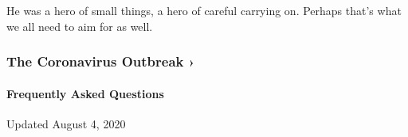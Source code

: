 He was a hero of small things, a hero of careful carrying on. Perhaps
that's what we all need to aim for as well.

\href{https://www.nytimes3xbfgragh.onion/news-event/coronavirus?action=click\&pgtype=Article\&state=default\&region=MAIN_CONTENT_3\&context=storylines_faq}{}

\hypertarget{the-coronavirus-outbreak-}{%
\subsubsection{The Coronavirus Outbreak
›}\label{the-coronavirus-outbreak-}}

\hypertarget{frequently-asked-questions}{%
\paragraph{Frequently Asked
Questions}\label{frequently-asked-questions}}

Updated August 4, 2020

